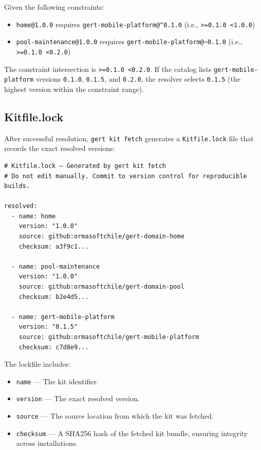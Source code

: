Given the following constraints:

\begin{itemize}
  \item \texttt{home@1.0.0} requires \texttt{gert-mobile-platform@\^{}0.1.0} (i.e., \texttt{>=0.1.0 <1.0.0})
  \item \texttt{pool-maintenance@1.0.0} requires \texttt{gert-mobile-platform@\~{}0.1.0} (i.e., \texttt{>=0.1.0 <0.2.0})
\end{itemize}

The constraint intersection is \texttt{>=0.1.0 <0.2.0}. If the catalog lists \texttt{gert-mobile-platform} versions \texttt{0.1.0}, \texttt{0.1.5}, and \texttt{0.2.0}, the resolver selects \texttt{0.1.5} (the highest version within the constraint range).

\subsection{Kitfile.lock}

After successful resolution, \texttt{gert kit fetch} generates a \texttt{Kitfile.lock} file that records the exact resolved versions:

\begin{verbatim}
# Kitfile.lock — Generated by gert kit fetch
# Do not edit manually. Commit to version control for reproducible builds.

resolved:
  - name: home
    version: "1.0.0"
    source: github:ormasoftchile/gert-domain-home
    checksum: a3f9c1...

  - name: pool-maintenance
    version: "1.0.0"
    source: github:ormasoftchile/gert-domain-pool
    checksum: b2e4d5...

  - name: gert-mobile-platform
    version: "0.1.5"
    source: github:ormasoftchile/gert-mobile-platform
    checksum: c7d8e9...
\end{verbatim}

The lockfile includes:

\begin{itemize}
  \item \texttt{name} — The kit identifier.
  \item \texttt{version} — The exact resolved version.
  \item \texttt{source} — The source location from which the kit was fetched.
  \item \texttt{checksum} — A SHA256 hash of the fetched kit bundle, ensuring integrity across installations.
\end{itemize}

